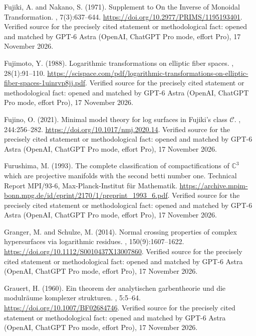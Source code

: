 \begin{thebibliography}{}
Fujiki, A. and Nakano, S. (1971).
\newblock Supplement to {On the Inverse of Monoidal Transformation}.
, 7(3):637--644.
\newblock \url{https://doi.org/10.2977/PRIMS/1195193401}. Verified source for the precisely cited statement or methodological fact: opened and matched by GPT-6 Astra (OpenAI, ChatGPT Pro mode, effort Pro), 17 November 2026.

Fujimoto, Y. (1988).
\newblock Logarithmic transformations on elliptic fiber spaces.
, 28(1):91--110.
\newblock \url{https://scispace.com/pdf/logarithmic-transformations-on-elliptic-fiber-spaces-1uinrvp8jj.pdf}. Verified source for the precisely cited statement or methodological fact: opened and matched by GPT-6 Astra (OpenAI, ChatGPT Pro mode, effort Pro), 17 November 2026.

Fujino, O. (2021).
\newblock Minimal model theory for log surfaces in {Fujiki}'s class {$\mathcal
  C$}.
, 244:256--282.
\newblock \url{https://doi.org/10.1017/nmj.2020.14}. Verified source for the precisely cited statement or methodological fact: opened and matched by GPT-6 Astra (OpenAI, ChatGPT Pro mode, effort Pro), 17 November 2026.

Furushima, M. (1993).
\newblock The complete classification of compactifications of {$\mathbb C^3$}
  which are projective manifolds with the second betti number one.
\newblock Technical Report MPI/93-6, Max-Planck-Institut f\"ur Mathematik.
\newblock \url{https://archive.mpim-bonn.mpg.de/id/eprint/2170/1/preprint_1993_6.pdf}. Verified source for the precisely cited statement or methodological fact: opened and matched by GPT-6 Astra (OpenAI, ChatGPT Pro mode, effort Pro), 17 November 2026.

Granger, M. and Schulze, M. (2014).
\newblock Normal crossing properties of complex hypersurfaces via logarithmic
  residues.
, 150(9):1607--1622.
\newblock \url{https://doi.org/10.1112/S0010437X13007860}. Verified source for the precisely cited statement or methodological fact: opened and matched by GPT-6 Astra (OpenAI, ChatGPT Pro mode, effort Pro), 17 November 2026.

Grauert, H. (1960).
\newblock Ein theorem der analytischen garbentheorie und die modulräume
  komplexer strukturen.
, 5:5--64.
\newblock \url{https://doi.org/10.1007/BF02684746}. Verified source for the precisely cited statement or methodological fact: opened and matched by GPT-6 Astra (OpenAI, ChatGPT Pro mode, effort Pro), 17 November 2026.


\end{thebibliography}
